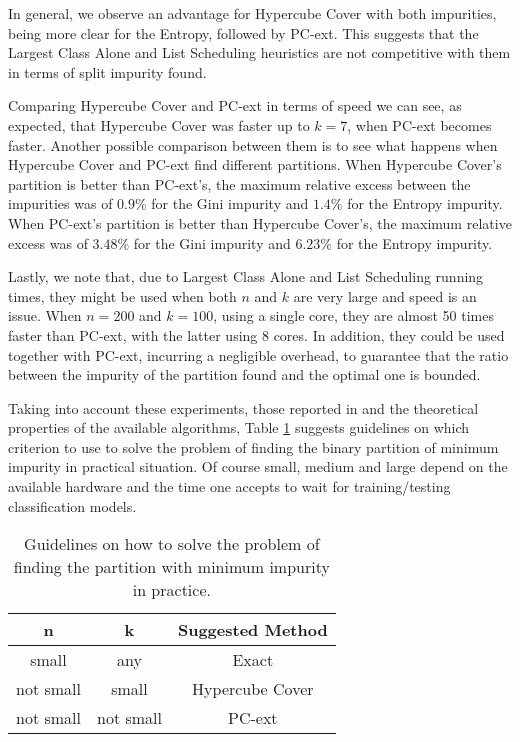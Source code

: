 In general, we observe an advantage for Hypercube Cover with both impurities, being more clear for the Entropy, followed by PC-ext. This suggests that the Largest Class Alone and List Scheduling heuristics are not competitive with them in terms of split impurity found.

Comparing Hypercube Cover and PC-ext in terms of speed we can see, as expected, that Hypercube Cover was faster up to $k=7$, when PC-ext becomes faster.
Another possible comparison between them is to see what happens when Hypercube Cover and PC-ext find different partitions. When Hypercube Cover's partition is better than PC-ext's, the maximum relative excess between the impurities was of $0.9\%$ for the Gini impurity and $1.4 \%$ for the Entropy impurity.
When PC-ext's partition is better than Hypercube Cover's, the  maximum relative excess was of $3.48 \%$ for the Gini impurity and $6.23 \%$ for the Entropy impurity. 

Lastly, we note that, due to Largest Class Alone and List Scheduling running times, they might be used when both $n$ and $k$ are very large and
speed is an  issue. When $n=200$ and $k=100$, using a single core, they are almost 50 times
faster than PC-ext, with the latter using 8 cores. In addition, they could be  used together with PC-ext, incurring a negligible overhead, to guarantee that the ratio between the impurity of the partition found and the optimal one is bounded.

 
Taking into account these  experiments, those reported in \cite{journals/datamine/CoppersmithHH99}
and the  theoretical properties of the available algorithms, 
Table  \ref{tab:guidelines}  suggests  guidelines on which criterion to use to solve the 
problem of finding the binary partition of minimum impurity in practical situation.
Of course small, medium and large depend on the available hardware and the time one accepts to wait for training/testing classification models. 


\begin{table}[htb]
\centering
\caption{Guidelines on how to solve the problem of finding the partition with minimum impurity in practice.}
\label{tab:guidelines}
\begin{tabular}{c|c|c}
{\bf n}    & {\bf k}   & {\bf Suggested Method} \\ \hline 
small      & any       &  Exact \\
not small  & small     &  Hypercube Cover \\
not small  & not small &  PC-ext \\
\end{tabular}
\end{table}

